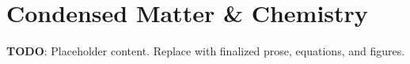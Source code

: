 
\section{Condensed Matter & Chemistry}
\label{sec:condensed-matter-chemistry}

\textbf{TODO}: Placeholder content. Replace with finalized prose, equations, and figures.

